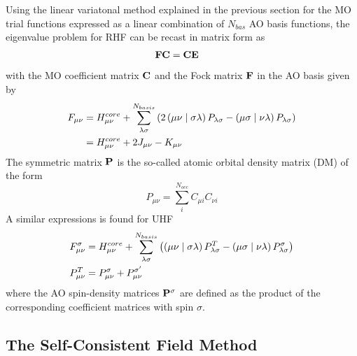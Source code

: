 \noindent Using the linear variatonal method explained in the previous section for the MO trial functions expressed as a linear combination of $N_{bas}$ AO basis functions, the eigenvalue problem for RHF can be recast in matrix form as
\begin{align}
\mathbf{F} \mathbf{C} &= \mathbf{C} \mathbf{E} 
\end{align}
\noindent with the MO coefficient matrix $\mathbf{C}$ and the Fock matrix $\mathbf{F}$ in the AO basis given by
\begin{align}
F_{\mu\nu} &= H^{core}_{\mu\nu} + \sum_{\lambda\sigma}^{N_{basis}} \left(2 \left( \mu\nu \mid \sigma\lambda \right) P_{\lambda\sigma} - \left( \mu\sigma \mid \nu\lambda \right) P_{\lambda\sigma} \right) \\
&= H^{core}_{\mu\nu} + 2 J_{\mu\nu} - K_{\mu\nu} 
\end{align}
\noindent The symmetric matrix $\mathbf{P}$ is the so-called atomic orbital density matrix (DM) of the form
\begin{equation}
P_{\mu\nu} = \sum_i^{N_{occ}} C_{\mu i} C_{\nu i} 
\end{equation}
\noindent A similar expressions is found for UHF
\begin{equation}
\begin{split}
F_{\mu\nu}^{\sigma} &= H^{core}_{\mu\nu} + \sum_{\lambda\sigma}^{N_{basis}} \left( \left( \mu\nu \mid \sigma\lambda \right) P^{T}_{\lambda\sigma} - \left( \mu\sigma \mid \nu\lambda \right) P^{\sigma}_{\lambda\sigma} \right) \\
P^T_{\mu\nu} &= P^{\sigma}_{\mu\nu} + P^{\sigma'}_{\mu\nu} 
\end{split}
\end{equation}
\noindent where the AO spin-density matrices $\mathbf{P}^{\sigma}$ are defined as the product of the corresponding coefficient matrices with spin $\sigma$.  

\subsection{The Self-Consistent Field Method}


